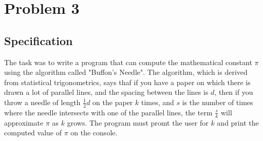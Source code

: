 \documentclass{scrartcl}
\begin{document}
\section*{Problem 3}
\subsection*{Specification}
The task was to write a program that can compute the mathematical 
constant $\pi$ using the algorithm called "Buffon's Needle".
The algorithm, which is derived from statistical trigonometrics, says
thaf if you have a paper on which there is drawn a lot of parallel
lines, and the spacing between the lines is $d$, then if you throw
a needle of length $\frac{1}{2}d$ on the paper $k$ times, and $s$
is the number of times where the needle intersects with one
of the parallel lines, the term $\frac{s}{k}$ will approximate $\pi$  
as $k$ grows.
The program must promt the user for $k$ and print the computed
value of $\pi$  on the console.
\end{document}
